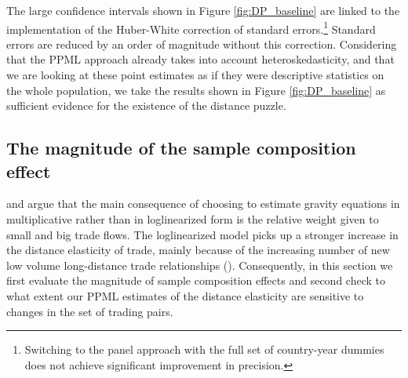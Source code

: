 \documentclass[12pt,twoside,a4paper,notitlepage]{article}
\begin{document}
The large confidence intervals shown in Figure \ref{fig:DP_baseline} are linked to the implementation of the Huber-White correction of standard errors.\footnote{Switching to the panel approach with the full set of country-year dummies does not achieve significant improvement in precision.}
Standard errors are reduced by an order of magnitude without this correction.  
Considering that  the PPML approach already takes into account heteroskedasticity, and that \fi we are looking at these point estimates as if they were descriptive statistics on the whole population, we take the results shown in Figure \ref{fig:DP_baseline} as sufficient evidence for the existence of the distance puzzle. 


\subsection{The magnitude of the sample composition effect} \label{subsec:data}

\cite{Mayer2019} and \cite{Head2013} argue that the main consequence of choosing to estimate gravity equations in multiplicative rather than in loglinearized form is the relative weight given to small and big trade flows. 
The loglinearized model picks up a stronger increase in the distance elasticity of trade, mainly because of the increasing number of new low volume long-distance trade relationships (\cite{Head2013}). 
Consequently, in this section we first evaluate the magnitude of sample composition effects and second check to what extent our PPML estimates of the distance elasticity are sensitive to changes in the set of trading pairs.
\end{document}
